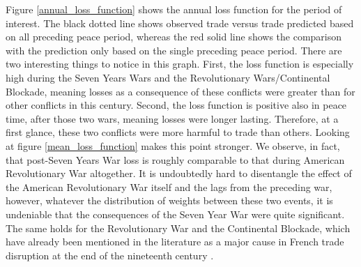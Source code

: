 \documentclass[12pt,a4paper,notitlepage,english]{article}
\begin{document}
Figure \ref{annual_loss_function} shows the annual loss function for the period of interest. The black dotted line shows observed trade versus trade predicted based on all preceding peace period, whereas the red solid line shows the comparison with the prediction only based on the single preceding peace period. There are two interesting things to notice in this graph. First, the loss function is especially high during the Seven Years Wars and the Revolutionary Wars/Continental Blockade, meaning losses as a consequence of these conflicts were greater than for other conflicts in this century. Second, the loss function is positive also in peace time, after those two wars, meaning losses were longer lasting. Therefore, at a first glance, these two conflicts were more harmful to trade than others. Looking at figure \ref{mean_loss_function} makes this point stronger. We observe, in fact, that post-Seven Years War loss is roughly comparable to that during American Revolutionary War altogether. It is undoubtedly hard to disentangle the effect of the American Revolutionary War itself and the lags from the preceding war, however, whatever the distribution of weights between these two events, it is undeniable that the consequences of the Seven Year War were quite significant. The same holds for the Revolutionary War and the Continental Blockade, which have already been mentioned in the literature as a major cause in French trade disruption at the end of the nineteenth century \citep{o2006worldwide}.
\end{document}
